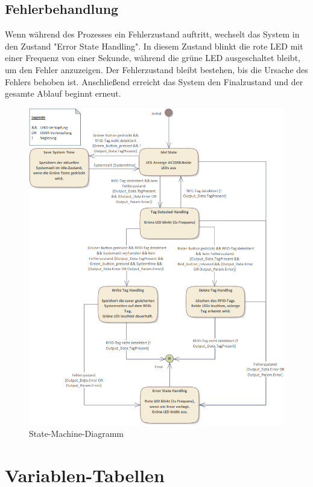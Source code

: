 \subsection*{Fehlerbehandlung}
\label{subsec:Fehlerbehandlung}

Wenn während des Prozesses ein Fehlerzustand auftritt, wechselt das System in den Zustand "Error State Handling". In diesem Zustand blinkt die rote LED mit einer Frequenz von einer Sekunde, während die grüne LED ausgeschaltet bleibt, um den Fehler anzuzeigen. Der Fehlerzustand bleibt bestehen, bis die Ursache des Fehlers behoben ist. Anschließend erreicht das System den Finalzustand und der gesamte Ablauf beginnt erneut.
\begin{figure}[h!]
	\centering
	\includegraphics[width=1.0\textwidth]{images/StateMachine.png}
	\vspace{1cm}
	\caption{State-Machine-Diagramm}
	\label{fig:StateMachineDiagramm}
\end{figure}

\clearpage
\newpage
\section*{Variablen-Tabellen}
\label{sec:VariablenTabellen}

